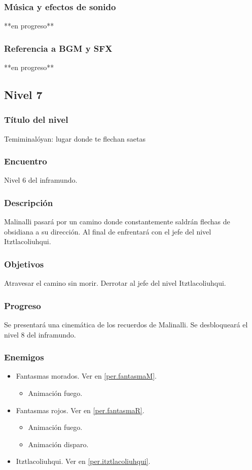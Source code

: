 \documentclass[11pt,letterpaper]{article}
\begin{document}
	\subsubsection{Música y efectos de sonido}
	**en progreso**
	\subsubsection{Referencia a BGM y SFX}
	**en progreso**
	
		\subsection{Nivel 7}
	\subsubsection{Título del nivel}
	Temiminalóyan: lugar donde te flechan saetas
	\subsubsection{Encuentro}
	Nivel 6 del inframundo.
	\subsubsection{Descripción}
	Malinalli pasará por un camino donde constantemente saldrán flechas de obsidiana a su dirección. Al final de enfrentará con el jefe del nivel Itztlacoliuhqui.
	\subsubsection{Objetivos}
	Atravesar el camino sin morir. Derrotar al jefe del nivel Itztlacoliuhqui.
	\subsubsection{Progreso}
	Se presentará una cinemática de los recuerdos de Malinalli. Se desbloqueará el nivel 8 del inframundo. 
	\subsubsection{Enemigos}
	\begin{itemize}
		\item Fantasmas morados. Ver en \ref{per.fantasmaM}.
			\begin{itemize}
				\item Animación fuego.
			\end{itemize}
		\item Fantasmas rojos. Ver en \ref{per.fantasmaR}.
		\begin{itemize}
				\item Animación fuego.
				\item Animación disparo.
			\end{itemize}
		\item Itztlacoliuhqui. Ver en \ref{per.itztlacoliuhqui}.
	\end{itemize}
\end{document}
